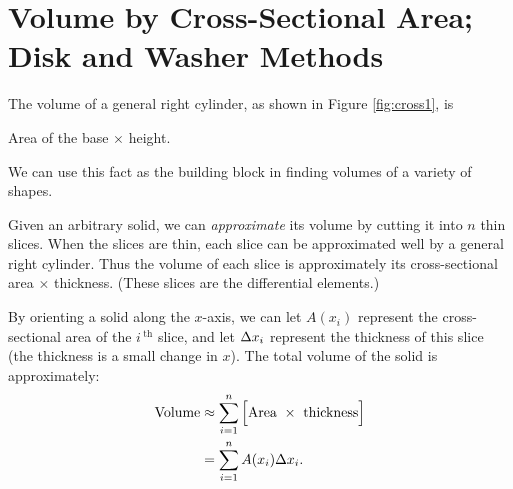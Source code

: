 \section{Volume by Cross-Sectional Area; Disk and Washer Methods}\label{sec:disk}

The volume of a general right cylinder, as shown in Figure \ref{fig:cross1}, is 

\hfill Area of the base $\times$ height. \hfill\null



\noindent We can use this fact as the building block in finding volumes of a variety of shapes.

Given an arbitrary solid, we can \textit{approximate} its volume by cutting it into $n$  thin slices. When the slices are thin, each slice can be approximated well by a general right cylinder. Thus the volume of each slice is approximately its cross-sectional area $\times$ thickness. (These slices are the differential elements.)

By orienting a solid along the $x$-axis, we can let $A(x_i)$ represent the cross-sectional area
of the $i\,^\text{th}$ slice, and let $\Delta x_i$ represent the thickness of this slice (the thickness is a small change in $x$). The total volume of the solid is approximately:
	\begin{align*} \text{Volume} &\approx \sum_{i=1}^n \Big[\text{Area}\ \times\ \text{thickness}\Big] \\
			&= \sum_{i=1}^n A(x_i)\dx_i.
	\end{align*}
	
